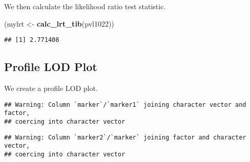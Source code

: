 \documentclass[oneside]{book}
\newenvironment{Shaded}{\begin{snugshade}}{\end{snugshade}}
\newcommand{\DataTypeTok}[1]{\textcolor[rgb]{0.13,0.29,0.53}{#1}}
\newcommand{\DecValTok}[1]{\textcolor[rgb]{0.00,0.00,0.81}{#1}}
\newcommand{\KeywordTok}[1]{\textcolor[rgb]{0.13,0.29,0.53}{\textbf{#1}}}
\newcommand{\NormalTok}[1]{#1}
\newcommand{\OperatorTok}[1]{\textcolor[rgb]{0.81,0.36,0.00}{\textbf{#1}}}
\newcommand{\StringTok}[1]{\textcolor[rgb]{0.31,0.60,0.02}{#1}}
\begin{document}
We then calculate the likelihood ratio test statistic.

\begin{Shaded}
\begin{Highlighting}[]
\NormalTok{(mylrt <-}\StringTok{ }\KeywordTok{calc_lrt_tib}\NormalTok{(pvl1022))}
\end{Highlighting}
\end{Shaded}

\begin{verbatim}
## [1] 2.771408
\end{verbatim}

\hypertarget{profile-lod-plot}{%
\subsection{Profile LOD Plot}\label{profile-lod-plot}}

We create a profile LOD plot.

\begin{Shaded}
\end{Shaded}

\begin{verbatim}
## Warning: Column `marker`/`marker1` joining character vector and factor,
## coercing into character vector
\end{verbatim}

\begin{verbatim}
## Warning: Column `marker2`/`marker` joining factor and character vector,
## coercing into character vector
\end{verbatim}
\end{document}
